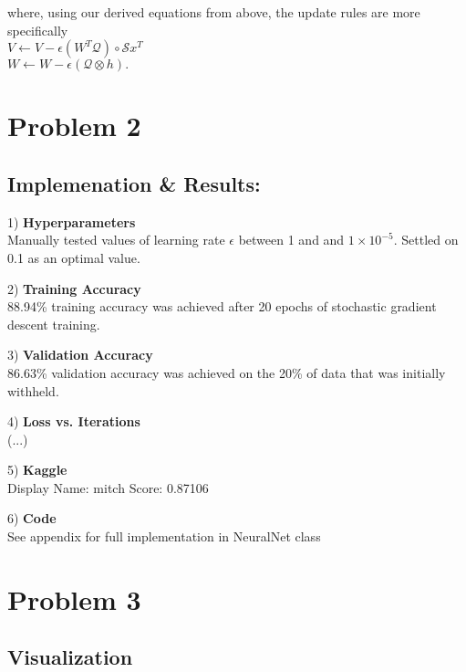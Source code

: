 \documentclass{report}
\newcommand{\tab}{\-\hspace{0.5cm}}
\begin{document}
where, using our derived equations from above, the update rules are more specifically\\
\tab \tab \tab \tab $V \leftarrow V - \epsilon(W^T \mathcal{Q}) \circ \mathcal{S} x^T $\\
\tab \tab \tab \tab $ W \leftarrow W - \epsilon(\mathcal{Q} \otimes h). $



\newpage
\section*{Problem 2}

\subsection*{Implemenation \& Results:}
1) \textbf{Hyperparameters}\\
\tab \tab Manually tested values of learning rate $\epsilon$ between 1 and and $1\times10^{-5}$. Settled on 0.1 as an optimal value.

2) \textbf{Training Accuracy}\\
\tab \tab 88.94\% training accuracy was achieved after 20 epochs of stochastic gradient descent training.

3) \textbf{Validation Accuracy}\\
\tab \tab 86.63\% validation accuracy was achieved on the 20\% of data that was initially withheld.

4) \textbf{Loss vs. Iterations}\\
\tab \tab (...)

5) \textbf{Kaggle}\\
\tab \tab Display Name: mitch
\tab \tab Score: 0.87106

6) \textbf{Code}\\
\tab \tab See appendix for full implementation in NeuralNet class



\newpage
\section*{Problem 3}

\subsection*{Visualization}
\end{document}
